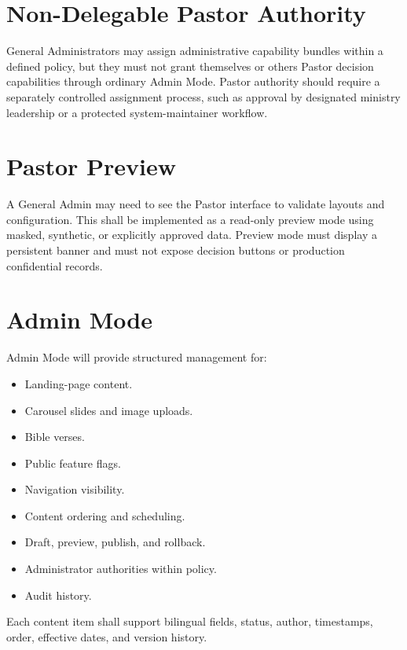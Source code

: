 \documentclass[11pt,a4paper,oneside]{report}
\begin{document}
\section{Non-Delegable Pastor Authority}

General Administrators may assign administrative capability bundles within a defined policy, but they must not grant themselves or others Pastor decision capabilities through ordinary Admin Mode. Pastor authority should require a separately controlled assignment process, such as approval by designated ministry leadership or a protected system-maintainer workflow.

\section{Pastor Preview}

A General Admin may need to see the Pastor interface to validate layouts and configuration. This shall be implemented as a read-only preview mode using masked, synthetic, or explicitly approved data. Preview mode must display a persistent banner and must not expose decision buttons or production confidential records.

\section{Admin Mode}

Admin Mode will provide structured management for:

\begin{itemize}
  \item Landing-page content.
  \item Carousel slides and image uploads.
  \item Bible verses.
  \item Public feature flags.
  \item Navigation visibility.
  \item Content ordering and scheduling.
  \item Draft, preview, publish, and rollback.
  \item Administrator authorities within policy.
  \item Audit history.
\end{itemize}

Each content item shall support bilingual fields, status, author, timestamps, order, effective dates, and version history.

\end{document}
